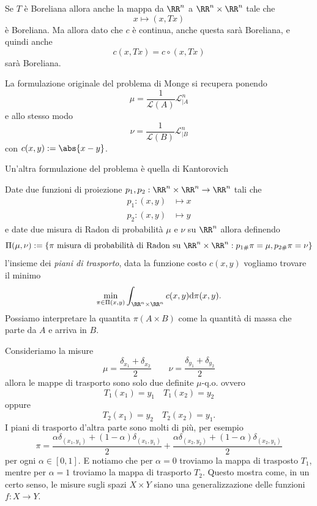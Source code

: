 \documentclass[11pt]{scrartcl}
\newcommand{\dif}{\text{d}}
\begin{document}
	\begin{remark}
		Se $T$ è Boreliana allora anche la mappa da $\RR^n$ a $\RR^n\times\RR^n$ tale che
		$$x\mapsto (x,Tx)$$
		è Boreliana. Ma allora dato che $c$ è continua, anche questa sarà Boreliana, e quindi anche
		$$c(x,Tx)=c\circ (x,Tx)$$
		sarà Boreliana.
	\end{remark}
	\begin{remark}
		La formulazione originale del problema di Monge si recupera ponendo
		$$\mu=\frac{1}{\mathscr{L}(A)}\mathscr{L}^n_{\mid A}$$
		e allo stesso modo
		$$\nu=\frac{1}{\mathscr{L}(B)}\mathscr{L}^n_{\mid B}$$
		con $c(x,y):=\abs{x-y}$.
	\end{remark}
	Un'altra formulazione del problema è quella di Kantorovich
	\begin{problem}
		Date due funzioni di proiezione $p_1,p_2:\RR^n\times \RR^n\to \RR^n$ tali che
		\begin{align}
			p_1:(x,y) &\mapsto x \\ 
			p_2:(x,y) &\mapsto y 
		\end{align}
		e date due misura di Radon di probabilità $\mu$ e $\nu$ su $\RR^n$ allora definendo
		$$\Pi (\mu,\nu):=\left\{\pi\text{ misura di probabilità di Radon su $\RR^n\times \RR^n$}:p_{1\#}\pi=\mu, p_{2\#}\pi =\nu\right\}$$
		l'insieme dei \textit{piani di trasporto}, data la funzione costo $c(x,y)$ vogliamo trovare il minimo
		$$\min_{\pi\in\Pi(x,y)}\int_{\RR^n\times \RR^n}c(x,y)\dif \pi(x,y).$$
		Possiamo interpretare la quantita $\pi(A\times B)$ come la quantità di massa che parte da $A$ e arriva in $B$.
	\end{problem}
	\begin{remark}
		Consideriamo la misure
		$$\mu=\frac{\delta_{x_1}+\delta_{x_2}}{2}\qquad \nu=\frac{\delta_{y_1}+\delta_{y_2}}{2}$$ 
		allora le mappe di trasporto sono solo due definite $\mu$-q.o. ovvero 
		$$T_1(x_1)=y_1 \quad T_1(x_2)=y_2$$
		oppure 
		$$T_2(x_1)=y_2 \quad T_2(x_2)=y_1.$$
		I piani di trasporto d'altra parte sono molti di più, per esempio
		$$\pi=\frac{\alpha\delta_{(x_1,y_1)}+(1-\alpha)\delta_{(x_1,y_1)}}{2}+\frac{\alpha\delta_{(x_2,y_2)}+(1-\alpha)\delta_{(x_2,y_1)}}{2}$$
		per ogni $\alpha\in [0,1]$. E notiamo che per $\alpha=0$ troviamo la mappa di trasposto $T_1$, mentre per $\alpha=1$ troviamo la mappa di trasporto $T_2$. Questo mostra come, in un certo senso, le misure sugli spazi $X\times Y$ siano una generalizzazione delle funzioni $f:X\to Y$. 
	\end{remark}
\end{document}
